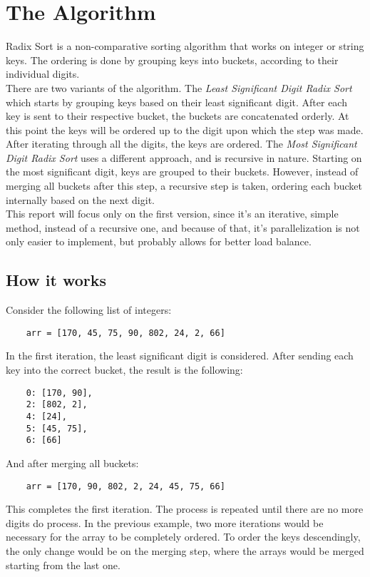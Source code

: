\section{The Algorithm}
\label{sec:radix}

Radix Sort is a non-comparative sorting algorithm that works on integer or string keys. The ordering is done by grouping keys into buckets, according to their individual digits.\\

There are two variants of the algorithm. The \emph{Least Significant Digit Radix Sort} which starts by grouping keys based on their least significant digit. After each key is sent to their respective bucket, the buckets are concatenated orderly. At this point the keys will be ordered up to the digit upon which the step was made. After iterating through all the digits, the keys are ordered. The \emph{Most Significant Digit Radix Sort} uses a different approach, and is recursive in nature. Starting on the most significant digit, keys are grouped to their buckets. However, instead of merging all buckets after this step, a recursive step is taken, ordering each bucket internally based on the next digit.\\

This report will focus only on the first version, since it's an iterative, simple method, instead of a recursive one, and because of that, it's parallelization is not only easier to implement, but probably allows for better load balance.\\


\subsection{How it works}
\label{subsec:how_it_works}

Consider the following list of integers:

\begin{lstlisting}
	arr = [170, 45, 75, 90, 802, 24, 2, 66]
\end{lstlisting}

In the first iteration, the least significant digit is considered. After sending each key into the correct bucket, the result is the following:

\begin{lstlisting}
	0: [170, 90],
	2: [802, 2],
	4: [24],
	5: [45, 75],
	6: [66]
\end{lstlisting}

And after merging all buckets:

\begin{lstlisting}
	arr = [170, 90, 802, 2, 24, 45, 75, 66]
\end{lstlisting}

This completes the first iteration. The process is repeated until there are no more digits do process. In the previous example, two more iterations would be necessary for the array to be completely ordered.
To order the keys descendingly, the only change would be on the merging step, where the arrays would be merged starting from the last one.
